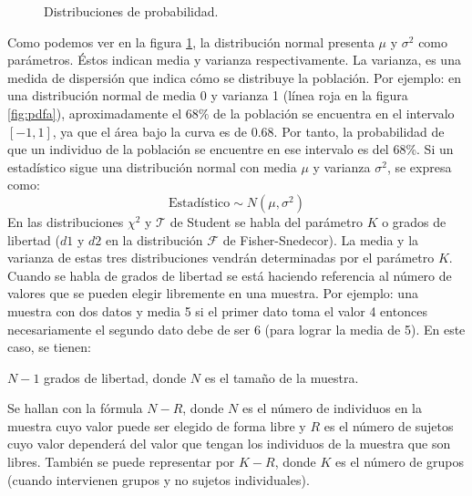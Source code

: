 \begin{figure}[h]
\centering
{}
\caption{Distribuciones de probabilidad.}
\label{fig:pdf}
\end{figure}
\newline
Como podemos ver en la figura \ref{fig:pdf}, la distribución normal presenta $\mu$ y $\sigma^2$ como parámetros.
Éstos indican media y varianza respectivamente. La varianza, es una medida de dispersión que indica cómo se
distribuye la población. Por ejemplo: en una distribución normal de media 0 y varianza 1 (línea roja en la figura \ref{fig:pdfa}), aproximadamente el $68\%$ de la población se encuentra en el intervalo $[-1,1]$,
ya que el área bajo la curva es de 0.68. Por tanto, la probabilidad de que un individuo de la población se
encuentre en ese intervalo es del 68\%. Si un estadístico sigue una distribución normal con media $\mu$ y
varianza $\sigma^2$, se expresa como:
\[ \mbox{Estadístico} \sim N(\mu,\sigma^2) \]
En las distribuciones $\chi^2$ y $\mathcal{T}$ de Student se habla del parámetro $K$ o grados de libertad ($d1$ y $d2$  en
la distribución $\mathcal{F}$ de Fisher-Snedecor). La media y la varianza de estas tres distribuciones vendrán
determinadas por el parámetro $K$. Cuando se habla de grados de libertad se está haciendo referencia al número de valores
que se pueden elegir libremente en una muestra. Por ejemplo: una muestra con dos datos y media 5 si el primer dato
toma el valor 4 entonces necesariamente el segundo dato debe de ser 6 (para lograr la media de 5). En este caso,
se tienen:
\begin{center}
$N - 1$ grados de libertad, donde $N$ es el tamaño de la muestra.
\end{center}
Se hallan con la fórmula $N-R$, donde $N$ es el número de individuos en la muestra cuyo valor puede ser elegido de
forma libre y $R$ es el número de sujetos cuyo valor dependerá del valor que tengan los individuos de la muestra que
son libres. También se puede representar por $K-R$, donde $K$ es el número de grupos (cuando intervienen grupos y
no sujetos individuales).

